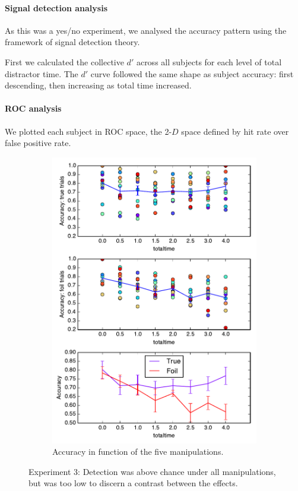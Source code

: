\paragraph{Signal detection analysis}

As this was a yes/no experiment, we analysed the accuracy pattern using the framework of signal detection theory\cite{green1966signal}. 

First we calculated the collective $d'$ across all subjects for each level of total distractor time. The $d'$ curve followed the same shape as subject accuracy: first descending, then increasing as total time increased.

\paragraph{ROC analysis}

We plotted each subject in ROC space, the 2-$D$ space defined by hit rate over false positive rate\cite{flach2003geometry}.



\begin{figure}[htp]
\centering
\begin{subfigure}[b]{\textwidth}
\centering
                \includegraphics[width=12cm]{img/fig_fire18_totaltime_YN.pdf}
                \caption{Accuracy in function of the five manipulations.}
          
        \end{subfigure}


\caption{Experiment 3: Detection was above chance under all manipulations, but was too low to discern a contrast between the effects.}
\end{figure}

